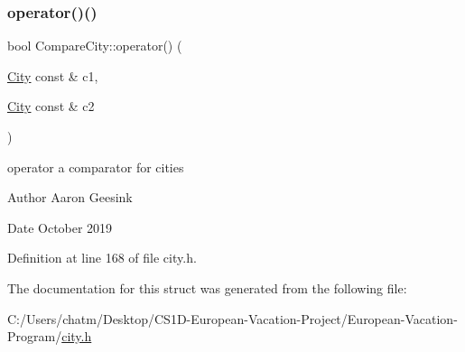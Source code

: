 \subsubsection{\texorpdfstring{operator()()}{operator()()}}
{\footnotesize\ttfamily bool Compare\+City\+::operator() (\begin{DoxyParamCaption}\item[{\mbox{\hyperlink{class_city}{City}} const \&}]{c1,  }\item[{\mbox{\hyperlink{class_city}{City}} const \&}]{c2 }\end{DoxyParamCaption})\hspace{0.3cm}{\ttfamily [inline]}}



operator a comparator for cities 

\begin{DoxyAuthor}{Author}
Aaron Geesink 
\end{DoxyAuthor}
\begin{DoxyDate}{Date}
October 2019 
\end{DoxyDate}


Definition at line 168 of file city.\+h.



The documentation for this struct was generated from the following file\+:\begin{DoxyCompactItemize}
\item 
C\+:/\+Users/chatm/\+Desktop/\+C\+S1\+D-\/\+European-\/\+Vacation-\/\+Project/\+European-\/\+Vacation-\/\+Program/\mbox{\hyperlink{city_8h}{city.\+h}}\end{DoxyCompactItemize}

